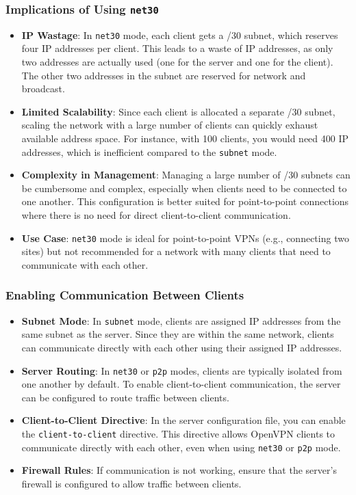 \subsubsection{Implications of Using \texttt{net30}}
\begin{itemize}
    \item \textbf{IP Wastage}: In \texttt{net30} mode, each client gets a /30 subnet, which reserves four IP addresses per client. This leads to a waste of IP addresses, as only two addresses are actually used (one for the server and one for the client). The other two addresses in the subnet are reserved for network and broadcast.
    \item \textbf{Limited Scalability}: Since each client is allocated a separate /30 subnet, scaling the network with a large number of clients can quickly exhaust available address space. For instance, with 100 clients, you would need 400 IP addresses, which is inefficient compared to the \texttt{subnet} mode.
    \item \textbf{Complexity in Management}: Managing a large number of /30 subnets can be cumbersome and complex, especially when clients need to be connected to one another. This configuration is better suited for point-to-point connections where there is no need for direct client-to-client communication.
    \item \textbf{Use Case}: \texttt{net30} mode is ideal for point-to-point VPNs (e.g., connecting two sites) but not recommended for a network with many clients that need to communicate with each other.
\end{itemize}

\subsubsection{Enabling Communication Between Clients}
\begin{itemize}
    \item \textbf{Subnet Mode}: In \texttt{subnet} mode, clients are assigned IP addresses from the same subnet as the server. Since they are within the same network, clients can communicate directly with each other using their assigned IP addresses. 
    \item \textbf{Server Routing}: In \texttt{net30} or \texttt{p2p} modes, clients are typically isolated from one another by default. To enable client-to-client communication, the server can be configured to route traffic between clients.
    \item \textbf{Client-to-Client Directive}: In the server configuration file, you can enable the \texttt{client-to-client} directive. This directive allows OpenVPN clients to communicate directly with each other, even when using \texttt{net30} or \texttt{p2p} mode. 
    \item \textbf{Firewall Rules}: If communication is not working, ensure that the server's firewall is configured to allow traffic between clients.
\end{itemize}

